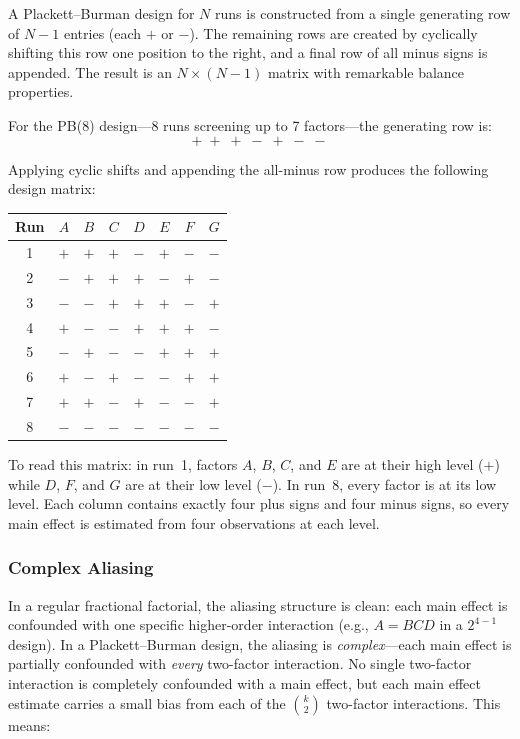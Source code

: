 \documentclass[11pt]{book}
\begin{document}
A Plackett--Burman design for $N$ runs is constructed from a single generating
row of $N-1$ entries (each $+$ or $-$). The remaining rows are created by
cyclically shifting this row one position to the right, and a final row of all
minus signs is appended. The result is an $N \times (N-1)$ matrix with
remarkable balance properties.

For the PB(8) design---8 runs screening up to 7 factors---the generating row is:
\[
+\;+\;+\;-\;+\;-\;-
\]

Applying cyclic shifts and appending the all-minus row produces the following
design matrix:

\begin{center}
\begin{tabular}{cccccccc}
\toprule
Run & $A$ & $B$ & $C$ & $D$ & $E$ & $F$ & $G$ \\
\midrule
1 & $+$ & $+$ & $+$ & $-$ & $+$ & $-$ & $-$ \\
2 & $-$ & $+$ & $+$ & $+$ & $-$ & $+$ & $-$ \\
3 & $-$ & $-$ & $+$ & $+$ & $+$ & $-$ & $+$ \\
4 & $+$ & $-$ & $-$ & $+$ & $+$ & $+$ & $-$ \\
5 & $-$ & $+$ & $-$ & $-$ & $+$ & $+$ & $+$ \\
6 & $+$ & $-$ & $+$ & $-$ & $-$ & $+$ & $+$ \\
7 & $+$ & $+$ & $-$ & $+$ & $-$ & $-$ & $+$ \\
8 & $-$ & $-$ & $-$ & $-$ & $-$ & $-$ & $-$ \\
\bottomrule
\end{tabular}
\end{center}

To read this matrix: in run~1, factors $A$, $B$, $C$, and $E$ are at their high
level ($+$) while $D$, $F$, and $G$ are at their low level ($-$). In run~8,
every factor is at its low level. Each column contains exactly four plus signs
and four minus signs, so every main effect is estimated from four observations
at each level.

\subsubsection{Complex Aliasing}

In a regular fractional factorial, the aliasing structure is clean: each main
effect is confounded with one specific higher-order interaction (e.g., $A = BCD$
in a $2^{4-1}$ design). In a Plackett--Burman design, the aliasing is
\emph{complex}---each main effect is partially confounded with \emph{every}
two-factor interaction. No single two-factor interaction is completely
confounded with a main effect, but each main effect estimate carries a small
bias from each of the $\binom{k}{2}$ two-factor interactions. This means:
\end{document}
